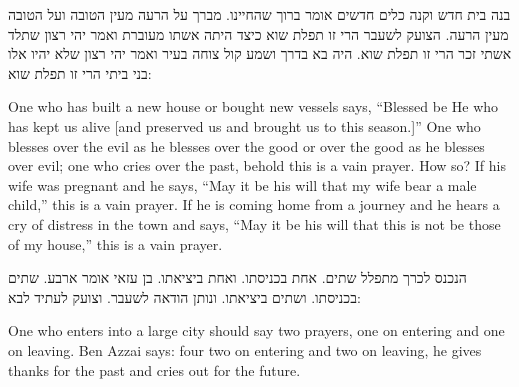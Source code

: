 \documentclass[12pt, openany]{book}
\newcommand{\textblock}[2]{
	{\fontsize{16pt}{20pt}\selectfont #1\\}
	
	\begin{english}
		#2
	\end{english}
	\clearpage
}
\begin{document}
\textblock{בנה בית חדש וקנה כלים חדשים אומר ברוך שהחיינו. מברך על הרעה מעין הטובה ועל הטובה מעין הרעה. הצועק לשעבר הרי זו תפלת שוא כיצד היתה אשתו מעוברת ואמר יהי רצון שתלד אשתי זכר הרי זו תפלת שוא. היה בא בדרך ושמע קול צוחה בעיר ואמר יהי רצון שלא יהיו אלו בני ביתי הרי זו תפלת שוא: }{One who has built a new house or bought new vessels says, “Blessed be He who has kept us alive {[and preserved us and brought us to this season.]}” One who blesses over the evil as he blesses over the good or over the good as he blesses over evil; one who cries over the past, behold this is a vain prayer. How so?  If his wife was pregnant and he says, “May it be his will that my wife bear a male child,” this is a vain prayer. If he is coming home from a journey and he hears a cry of distress in the town and says, “May it be his will that this is not be those of my house,” this is a vain prayer.}
\textblock{הנכנס לכרך מתפלל שתים. אחת בכניסתו. ואחת ביציאתו. בן עזאי אומר ארבע. שתים בכניסתו. ושתים ביציאתו. ונותן הודאה לשעבר. וצועק לעתיד לבא: }{One who enters into a large city should say two prayers, one on entering and one on leaving. Ben Azzai says: four two on entering and two on leaving, he gives thanks for the past and cries out for the future.}
\end{document}
